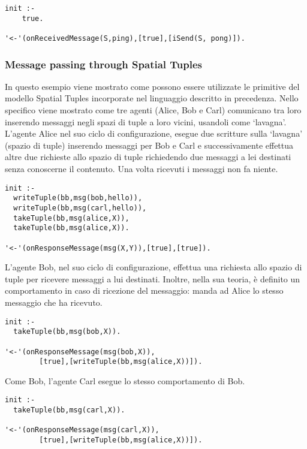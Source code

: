 \medskip
\begin{lstlisting}[firstnumber=1,label={lst:PongAgent},caption={Agente Pong}]
init :-
    true.

'<-'(onReceivedMessage(S,ping),[true],[iSend(S, pong)]).
\end{lstlisting}

\subsubsection{Message passing through Spatial Tuples}
In questo esempio viene mostrato come possono essere utilizzate le primitive del modello Spatial Tuples incorporate nel linguaggio descritto in precedenza. Nello specifico viene mostrato come tre agenti (Alice, Bob e Carl) comunicano tra loro inserendo messaggi negli spazi di tuple a loro vicini, usandoli come `lavagna'.
L'agente Alice nel suo ciclo di configurazione, esegue due scritture sulla `lavagna' (spazio di tuple) inserendo messaggi per Bob e Carl e successivamente effettua altre due richieste allo spazio di tuple richiedendo due messaggi a lei destinati senza conoscerne il contenuto. Una volta ricevuti i messaggi non fa niente.

\medskip
\begin{lstlisting}[firstnumber=1,label={lst:Alice},caption={Alice}]
init :-
  writeTuple(bb,msg(bob,hello)),
  writeTuple(bb,msg(carl,hello)),
  takeTuple(bb,msg(alice,X)),
  takeTuple(bb,msg(alice,X)).

'<-'(onResponseMessage(msg(X,Y)),[true],[true]).
\end{lstlisting}

L'agente Bob, nel suo ciclo di configurazione, effettua una richiesta allo spazio di tuple per ricevere messaggi a lui destinati. Inoltre, nella sua teoria, è definito un comportamento in caso di ricezione del messaggio: manda ad Alice lo stesso messaggio che ha ricevuto.
\medskip
\begin{lstlisting}[firstnumber=1,label={lst:Bob},caption={Bob}]
init :-
  takeTuple(bb,msg(bob,X)).

'<-'(onResponseMessage(msg(bob,X)),
		[true],[writeTuple(bb,msg(alice,X))]).
\end{lstlisting}

Come Bob, l'agente Carl esegue lo stesso comportamento di Bob.
\medskip
\begin{lstlisting}[firstnumber=1,label={lst:Carl},caption={Carl}]
init :-
  takeTuple(bb,msg(carl,X)).

'<-'(onResponseMessage(msg(carl,X)),
		[true],[writeTuple(bb,msg(alice,X))]).
\end{lstlisting}

